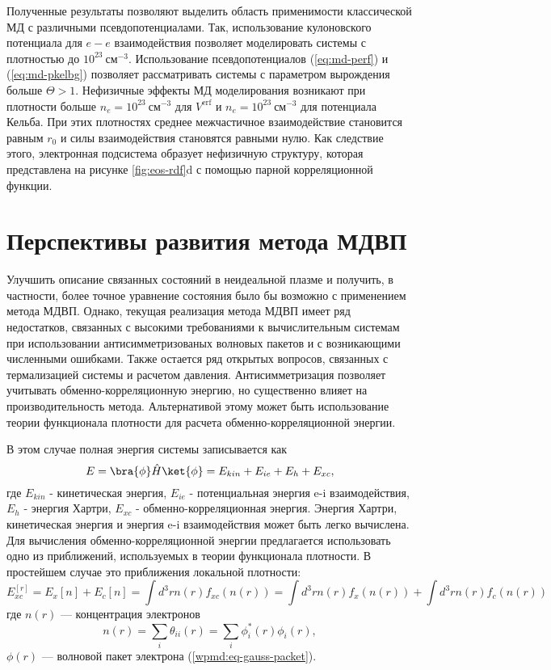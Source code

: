 Полученные результаты позволяют выделить область применимости классической МД с различными псевдопотенциалами. Так, использование кулоновского потенциала для $e-e$ взаимодействия позволяет моделировать системы с плотностью до $10^{23}~\text{см}^{-3}$. Использование псевдопотенциалов (\ref{eq:md-perf}) и (\ref{eq:md-pkelbg}) позволяет рассматривать системы с параметром вырождения больше $\Theta > 1$. Нефизичные эффекты МД моделирования возникают при плотности больше $n_e=10^{23}~\text{см}^{-3}$ для $V^{\text{erf}}$ и $n_e=10^{23}~\text{см}^{-3}$ для потенциала Кельба. При этих плотностях среднее межчастичное взаимодействие становится равным $r_0$ и силы взаимодействия становятся равными нулю. Как следствие этого, электронная подсистема образует нефизичную структуру, которая представлена на рисунке \ref{fig:eos-rdf}d с помощью парной корреляционной функции. 

\section{Перспективы развития метода МДВП}

Улучшить описание связанных состояний в неидеальной плазме и получить, в частности, более точное уравнение состояния было бы возможно с применением метода МДВП. Однако, текущая реализация метода МДВП имеет ряд недостатков, связанных с высокими требованиями к вычислительным системам при использовании антисимметризованых волновых пакетов и с возникающими численными ошибками. Также остается ряд открытых вопросов, связанных с термализацией системы и расчетом давления. Антисимметризация позволяет учитывать обменно-корреляционную энергию, но существенно влияет на производительность метода. Альтернативой этому может быть использование теории функционала плотности для расчета обменно-корреляционной энергии. 

В этом случае полная энергия системы записывается как
\begin{equation}
E=\bra{\phi}\hat{H}\ket{\phi} = E_{kin} + E_{ie} + E_h + E_{xc},
\end{equation}
где $E_{kin}$ - кинетическая энергия, $E_{ie}$ - потенциальная энергия e-i взаимодействия, 
$E_h$ - энергия Хартри, $E_{xc}$ - обменно-корреляционная энергия. Энергия Хартри, кинетическая энергия и энергия e-i взаимодействия может быть легко вычислена. Для вычисления обменно-корреляционной энергии предлагается использовать одно из приближений, используемых в теории функционала плотности. В простейшем случае это приближения локальной плотности:
\begin{equation}
E_{xc}^{[r]} = E_x[n] + E_c[n] = \int d^3rn(r)f_{xc}(n(r)) = \int d^3rn(r)f_{x}(n(r)) + \int d^3rn(r)f_c(n(r))
\end{equation} %
где $n(r)$ --- концентрация электронов
\begin{equation}
n(r) = \sum_i \theta_{ii}(r) =  \sum_i \phi_i^*(r)\phi_i(r),
\end{equation}
$\phi(r)$ --- волновой пакет электрона (\ref{wpmd:eq-gauss-packet}).

